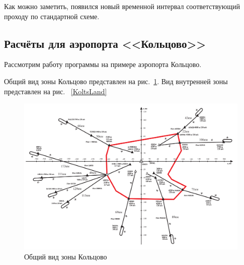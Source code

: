 \documentclass[12pt, a4 paper]{article}
\theoremstyle{plain}
\begin{document}
Как можно заметить, появился новый временной интервал соответствующий проходу по стандартной схеме.

\newpage



\subsection{Расчёты для аэропорта <<Кольцово>>}

Рассмотрим работу программы на примере аэропорта Кольцово.

Общий вид зоны Кольцово представлен на рис.~\ref{KoltsAll}. Вид внутренней зоны представлен на рис.~ \ref{KoltsLand}

\begin{figure}[h]
  \begin{center}
      \includegraphics[scale=0.25]{Koltsovo01.png}
        \caption{Общий вид зоны Кольцово}                                                                             
    \label{KoltsAll}
  \end{center}
\end{figure}
\end{document}
